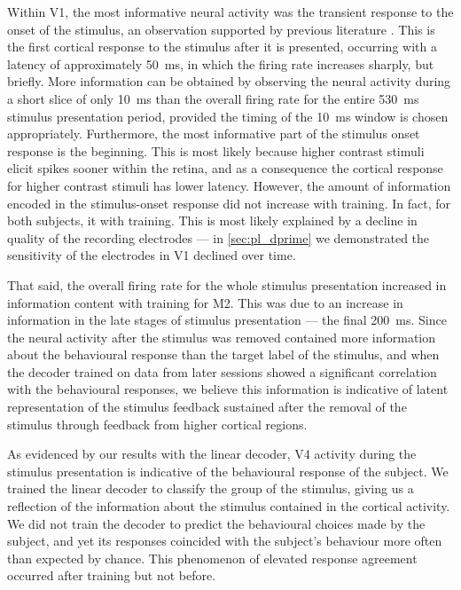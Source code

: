 Within \ac{V1}, the most informative neural activity was the transient response to the onset of the stimulus, an observation supported by previous literature \citep{Muller2001}.
This is the first cortical response to the stimulus after it is presented, occurring with a latency of approximately \SI{50}{\milli\second}, in which the firing rate increases sharply, but briefly.
More information can be obtained by observing the neural activity during a short slice of only \SI{10}{\milli\second} than the overall firing rate for the entire \SI{530}{\milli\second} stimulus presentation period, provided the timing of the \SI{10}{\milli\second} window is chosen appropriately.
Furthermore, the most informative part of the stimulus onset response is the beginning.
This is most likely because higher contrast stimuli elicit spikes sooner within the retina, and as a consequence the cortical response for higher contrast stimuli has lower latency.
However, the amount of information encoded in the stimulus-onset response did not increase with training.
In fact, for both subjects, it  with training.
This is most likely explained by a decline in quality of the recording electrodes --- in \autoref{sec:pl_dprime} we demonstrated the sensitivity of the electrodes in \ac{V1} declined over time.

That said, the overall firing rate for the whole stimulus presentation increased in information content with training for \ac{M2}.
This was due to an increase in information in the late stages of stimulus presentation --- the final \SI{200}{\milli\second}.
Since the neural activity after the stimulus was removed contained more information about the behavioural response than the target label of the stimulus, and when the decoder trained on data from later sessions showed a significant correlation with the behavioural responses, we believe this information is indicative of latent representation of the stimulus feedback sustained after the removal of the stimulus through feedback from higher cortical regions.

As evidenced by our results with the linear decoder, \ac{V4} activity during the stimulus presentation is indicative of the behavioural response of the subject.
We trained the linear decoder to classify the group of the stimulus, giving us a reflection of the information about the stimulus contained in the cortical activity.
We did not train the decoder to predict the behavioural choices made by the subject, and yet its responses coincided with the subject's behaviour more often than expected by chance.
This phenomenon of elevated response agreement occurred after training but not before.

